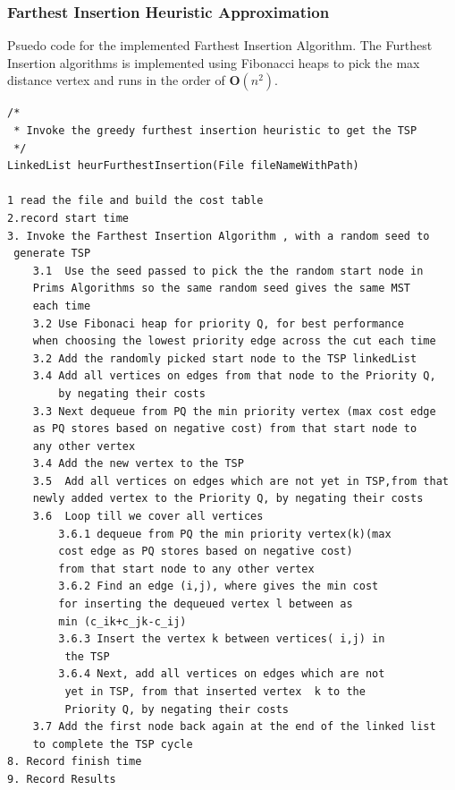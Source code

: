 \documentclass[twoside,11pt]{article}
\begin{document}
\subsubsection{Farthest Insertion Heuristic Approximation}
Psuedo code for the implemented Farthest Insertion Algorithm.  The Furthest Insertion algorithms is implemented using Fibonacci heaps to pick the max distance vertex and runs in the order of $\mathbf{O}(n^2)$.
\begin{lstlisting}
/*
 * Invoke the greedy furthest insertion heuristic to get the TSP
 */
LinkedList heurFurthestInsertion(File fileNameWithPath) 
	
1 read the file and build the cost table
2.record start time 
3. Invoke the Farthest Insertion Algorithm , with a random seed to
 generate TSP
	3.1  Use the seed passed to pick the the random start node in 
	Prims Algorithms so the same random seed gives the same MST 
	each time
	3.2 Use Fibonaci heap for priority Q, for best performance
	when choosing the lowest priority edge across the cut each time 
	3.2 Add the randomly picked start node to the TSP linkedList
	3.4 Add all vertices on edges from that node to the Priority Q, 
		by negating their costs
	3.3 Next dequeue from PQ the min priority vertex (max cost edge
	as PQ stores based on negative cost) from that start node to 
	any other vertex
	3.4 Add the new vertex to the TSP
	3.5  Add all vertices on edges which are not yet in TSP,from that 
	newly added vertex to the Priority Q, by negating their costs
	3.6  Loop till we cover all vertices
		3.6.1 dequeue from PQ the min priority vertex(k)(max 
		cost edge as PQ stores based on negative cost)
		from that start node to any other vertex
		3.6.2 Find an edge (i,j), where gives the min cost 
		for inserting the dequeued vertex l between as 
		min (c_ik+c_jk-c_ij)
		3.6.3 Insert the vertex k between vertices( i,j) in
		 the TSP
		3.6.4 Next, add all vertices on edges which are not
		 yet in TSP, from that inserted vertex  k to the 
		 Priority Q, by negating their costs
	3.7 Add the first node back again at the end of the linked list 
	to complete the TSP cycle
8. Record finish time 
9. Record Results 	
\end{lstlisting}
\end{document}
